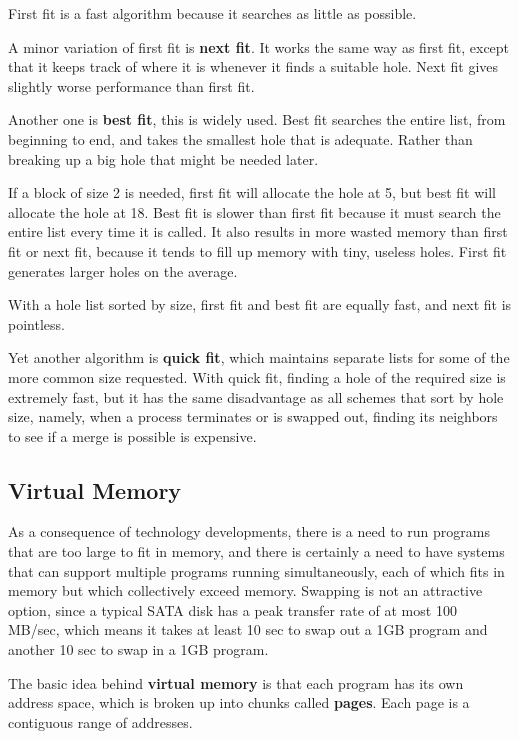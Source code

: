 \documentclass[11pt,a4paper]{article}
\begin{document}
First fit is a fast algorithm because it searches as little as possible.

A minor variation of first fit is \textbf{next fit}. It works the same way as first fit, except that it keeps track of where it is whenever it finds a suitable hole. Next fit gives slightly worse performance than first fit.

Another one is \textbf{best fit}, this is widely used. Best fit searches the entire list, from beginning to end, and takes the smallest hole that is adequate. Rather than breaking up a big hole that might be needed later.

If a block of size 2 is needed, first fit will allocate the hole at 5, but best fit will allocate the hole at 18. Best fit is slower than first fit because it must search the entire list every time it is called. It also results in more wasted memory than first fit or next fit, because it tends to fill up memory with tiny, useless holes. First fit generates larger holes on the average.

With a hole list sorted by size, first fit and best fit are equally fast, and next fit is pointless. 

Yet another algorithm is \textbf{quick fit}, which maintains separate lists for some of the more common size requested. With quick fit, finding a hole of the required size is extremely fast, but it has the same disadvantage as all schemes that sort by hole size, namely, when a process terminates or is swapped out, finding its neighbors to see if a merge is possible is expensive.  

\subsection{Virtual Memory}
As a consequence of technology developments, there is a need to run programs that are too large to fit in memory, and there is certainly a need to have systems that can support multiple programs running simultaneously, each of which fits in memory but which collectively exceed memory. Swapping is not an attractive option, since a typical SATA disk has a peak transfer rate of at most 100 MB/sec, which means it takes at least 10 sec to swap out a 1GB program and another 10 sec to swap in a 1GB program.

The basic idea behind \textbf{virtual memory} is that each program has its own address space, which is broken up into chunks called \textbf{pages}. Each page is a contiguous range of addresses.
\end{document}
